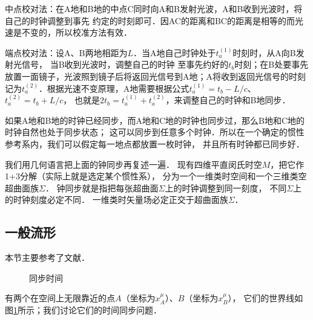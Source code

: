 \noindent{}中点校对法：在A地和B地的中点C同时向A和B发射光波，A和B收到光波时，将自己的时钟调整到事先
约定的时刻即可．因AC的距离和BC的距离是相等的而光速是不变的，所以校准方法有效．

\noindent{}端点校对法：设A、B两地相距为$L$．当A地自己时钟处于$t_a^{(1)}$时刻时，从A向B发射光信号，
当B收到光波时，调整自己的时钟
至事先约好的$t_b$时刻；在B处要事先放置一面镜子，光波照到镜子后将返回光信号到A地；A将收到返回光信号的时刻
记为$t_a^{(2)}$．根据光速不变原理，A地需要根据公式$t_a^{(1)}=t_b-L/c$、$t_a^{(2)}=t_b+L/c$，
也就是$2t_b=t_a^{(1)}+t_a^{(2)}$，来调整自己的时钟和B地同步．

如果A地和B地的时钟已经同步，而A地和C地的时钟也同步过，那么B地和C地的时钟自然也处于同步状态；
这可以同步到任意多个时钟．所以在一个确定的惯性参考系内，我们可以假定每一地点都放置一枚时钟，
并且所有时钟都已同步好．


我们用几何语言把上面的钟同步再复述一遍．
现有四维平直闵氏时空$M$，把它作1+3分解（实际上就是选定某个惯性系），
分为一个一维类时空间和一个三维类空超曲面族$\Sigma$．
钟同步就是指把每张超曲面$\Sigma$上的时钟调整到同一刻度，
不同$\Sigma$上的时钟刻度必定不同．
一维类时矢量场必定正交于超曲面族$\Sigma$．



\subsection{一般流形}

本节主要参考了文献\parencite[\S 84]{landau_2-classical-fields}．

\begin{figure}[htb]
    \centering
    \caption{同步时间}\label{chfd:pic_syn-time}
\end{figure}


有两个在空间上无限靠近的点$A$（坐标为$x^\mu_A$）、$B$（坐标为$x^\mu_B$），
它们的世界线如图\ref{chfd:pic_syn-time}所示；我们讨论它们的时间同步问题．

